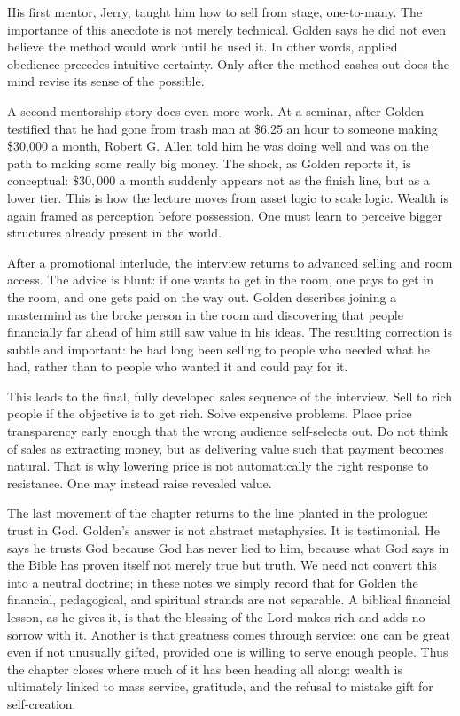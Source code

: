 His first mentor, Jerry, taught him how to sell from stage, one-to-many. The importance of this anecdote is not merely technical. Golden says he did not even believe the method would work until he used it. In other words, applied obedience precedes intuitive certainty. Only after the method cashes out does the mind revise its sense of the possible.

A second mentorship story does even more work. At a seminar, after Golden testified that he had gone from trash man at \$6.25 an hour to someone making \$30,000 a month, Robert G. Allen told him he was doing well and was on the path to making some really big money. The shock, as Golden reports it, is conceptual: \( \$30{,}000 \) a month suddenly appears not as the finish line, but as a lower tier. This is how the lecture moves from asset logic to scale logic. Wealth is again framed as perception before possession. One must learn to perceive bigger structures already present in the world.

After a promotional interlude, the interview returns to advanced selling and room access. The advice is blunt: if one wants to get in the room, one pays to get in the room, and one gets paid on the way out. Golden describes joining a mastermind as the broke person in the room and discovering that people financially far ahead of him still saw value in his ideas. The resulting correction is subtle and important: he had long been selling to people who needed what he had, rather than to people who wanted it and could pay for it.

This leads to the final, fully developed sales sequence of the interview. Sell to rich people if the objective is to get rich. Solve expensive problems. Place price transparency early enough that the wrong audience self-selects out. Do not think of sales as extracting money, but as delivering value such that payment becomes natural. That is why lowering price is not automatically the right response to resistance. One may instead raise revealed value.

The last movement of the chapter returns to the line planted in the prologue: trust in God. Golden's answer is not abstract metaphysics. It is testimonial. He says he trusts God because God has never lied to him, because what God says in the Bible has proven itself not merely true but truth. We need not convert this into a neutral doctrine; in these notes we simply record that for Golden the financial, pedagogical, and spiritual strands are not separable. A biblical financial lesson, as he gives it, is that the blessing of the Lord makes rich and adds no sorrow with it. Another is that greatness comes through service: one can be great even if not unusually gifted, provided one is willing to serve enough people. Thus the chapter closes where much of it has been heading all along: wealth is ultimately linked to mass service, gratitude, and the refusal to mistake gift for self-creation.

